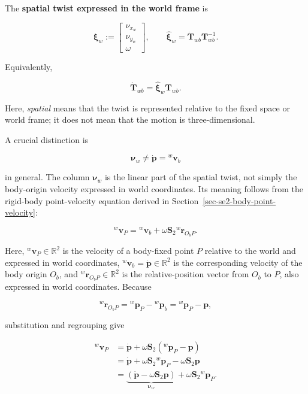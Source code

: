 \documentclass[
  australian,
  12pt,
  letterpaper,
  DIV=11,
  numbers=noendperiod,
  twoside]{scrreprt}
\begin{document}
The \textbf{spatial twist expressed in the world frame} is

\[
\boxed{
\boldsymbol\xi_w
\mathrel{:=}
\begin{bmatrix}
\nu_{x_w}\\
\nu_{y_w}\\
\omega
\end{bmatrix},
\qquad
\widehat{\boldsymbol\xi}_w
=
\dot{\mathbf T}_{wb}\mathbf T_{wb}^{-1}
}.
\]

Equivalently,

\[
\boxed{
\dot{\mathbf T}_{wb}
=
\widehat{\boldsymbol\xi}_w\mathbf T_{wb}
}.
\]

Here, \emph{spatial} means that the twist is represented relative to the
fixed space or world frame; it does not mean that the motion is
three-dimensional.

A crucial distinction is

\[
\boldsymbol\nu_w
\neq
\dot{\mathbf p}
=
{}^w\mathbf v_b
\]

in general. The column \(\boldsymbol\nu_w\) is the linear part of the
spatial twist, not simply the body-origin velocity expressed in world
coordinates. Its meaning follows from the rigid-body point-velocity
equation derived in Section~\ref{sec-se2-body-point-velocity}:

\[
{}^w\mathbf v_P
=
{}^w\mathbf v_b
+
\omega\mathbf S_2{}^w\mathbf r_{O_bP}.
\]

Here, \({}^w\mathbf v_P\in\mathbb R^2\) is the velocity of a body-fixed
point \(P\) relative to the world and expressed in world coordinates,
\({}^w\mathbf v_b=\dot{\mathbf p}\in\mathbb R^2\) is the corresponding
velocity of the body origin \(O_b\), and
\({}^w\mathbf r_{O_bP}\in\mathbb R^2\) is the relative-position vector
from \(O_b\) to \(P\), also expressed in world coordinates. Because

\[
{}^w\mathbf r_{O_bP}
=
{}^w\mathbf p_P-{}^w\mathbf p_b
=
{}^w\mathbf p_P-\mathbf p,
\]

substitution and regrouping give

\[
\begin{aligned}
{}^w\mathbf v_P
&=
\dot{\mathbf p}
+
\omega\mathbf S_2
\left(
{}^w\mathbf p_P-\mathbf p
\right)\\
&=
\dot{\mathbf p}
+
\omega\mathbf S_2{}^w\mathbf p_P
-
\omega\mathbf S_2\mathbf p\\
&=
\underbrace{
\left(
\dot{\mathbf p}
-
\omega\mathbf S_2\mathbf p
\right)
}_{\boldsymbol\nu_w}
+
\omega\mathbf S_2{}^w\mathbf p_P.
\end{aligned}
\]
\end{document}
